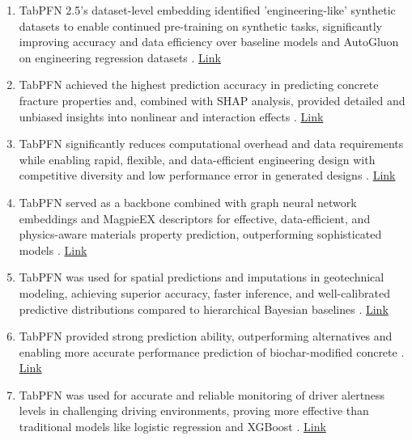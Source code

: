 \begin{enumerate}
\item TabPFN 2.5's dataset-level embedding identified 'engineering-like' synthetic datasets to enable continued pre-training on synthetic tasks, significantly improving accuracy and data efficiency over baseline models and AutoGluon on engineering regression datasets \cite{regenwetter2026engineeringregressionrealdatatraining}. \href{http://arxiv.org/abs/2603.04692v1}{Link}

\item TabPFN achieved the highest prediction accuracy in predicting concrete fracture properties and, combined with SHAP analysis, provided detailed and unbiased insights into nonlinear and interaction effects \cite{nikzad2026from}. \href{https://doi.org/10.1016/j.mlwa.2026.100877}{Link}

\item TabPFN significantly reduces computational overhead and data requirements while enabling rapid, flexible, and data-efficient engineering design with competitive diversity and low performance error in generated designs \cite{wang2026tabpfnzeroshotparametricengineering}. \href{http://arxiv.org/abs/2602.02735v1}{Link}

\item TabPFN served as a backbone combined with graph neural network embeddings and MagpieEX descriptors for effective, data-efficient, and physics-aware materials property prediction, outperforming sophisticated models \cite{li2025contextlearningfoundationmodels}. \href{http://arxiv.org/abs/2601.00133v1}{Link}

\item TabPFN was used for spatial predictions and imputations in geotechnical modeling, achieving superior accuracy, faster inference, and well-calibrated predictive distributions compared to hierarchical Bayesian baselines \cite{Saito_2026}. \href{http://arxiv.org/abs/2509.03191v1}{Link}

\item TabPFN provided strong prediction ability, outperforming alternatives and enabling more accurate performance prediction of biochar-modified concrete \cite{k2026advanced}. \href{https://www.e3s-conferences.org/articles/e3sconf/pdf/2026/20/e3sconf_isdcp2026_01008.pdf}{Link}

\item TabPFN was used for accurate and reliable monitoring of driver alertness levels in challenging driving environments, proving more effective than traditional models like logistic regression and XGBoost  \cite{liu2025prediction}. \href{https://doi.org/10.1080/15389588.2025.2577155}{Link}


\end{enumerate}
